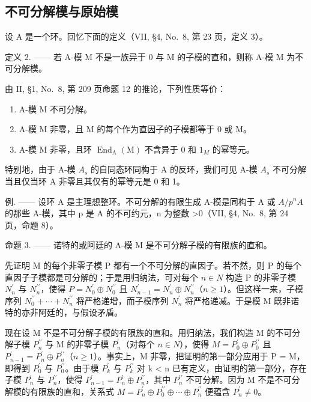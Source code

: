 \subsection{不可分解模与原始模}

设 A 是一个环。回忆下面的定义（VII, §4, No.~8, 第 23 页，定义 3）。

定义 2. —— 若 A-模 M 不是一族异于 0 与 M 的子模的直和，则称 A-模 M 为不可分解模。

由 II, §1, No.~8, 第 209 页命题 12 的推论，下列性质等价：

\begin{enumerate}
\def\labelenumi{\alph{enumi})}
\item
  A-模 M 不可分解。
\item
  A-模 M 非零，且 M 的每个作为直因子的子模都等于 0 或 M。
\item
  A-模 M 非零，且环 \(\operatorname{End}_{\mathrm{A}}(\mathrm{M})\) 不含异于 0 和 \(1_{M}\) 的幂等元。
\end{enumerate}

特别地，由于 A-模 \(A_{s}\) 的自同态环同构于 A 的反环，我们可见 A-模 \(A_{s}\) 不可分解当且仅当环 A 非零且其仅有的幂等元是 0 和 1。

例. —— 设环 A 是主理想整环。不可分解的有限生成 A-模是同构于 A 或 \(A/p^{n}A\) 的那些 A-模，其中 p 是 A 的不可约元，n 为整数 \textgreater0（VII, §4, No.~8, 第 24 页，命题 8）。

命题 3. —— 诺特的或阿廷的 A-模 M 是不可分解子模的有限族的直和。

先证明 M 的每个非零子模 P 都有一个不可分解的直因子。若不然，则 P 的每个直因子子模都是可分解的；于是用归纳法，可对每个 \(n \in N\) 构造 P 的非零子模 \(N_{n}^{\prime}\) 与 \(N_{n}^{\prime\prime}\)，使得 \(P = N_{0}^{\prime} \oplus N_{0}^{\prime\prime}\) 且 \(N_{n-1}^{\prime} = N_{n}^{\prime} \oplus N_{n}^{\prime\prime}\)（\(n \geqslant 1\)）。但这样一来，子模序列 \(N_{0}^{\prime\prime} + \cdots + N_{n}^{\prime\prime}\) 将严格递增，而子模序列 \(N_{n}^{\prime}\) 将严格递减。于是模 M 既非诺特的亦非阿廷的，与假设矛盾。

现在设 M 不是不可分解子模的有限族的直和。用归纳法，我们构造 M 的不可分解子模 \(P_{n}^{\prime\prime}\) 与 M 的非零子模 \(P_{n}^{\prime}\)（对每个 \(n \in N\)），使得 \(M = P_{0}^{\prime} \oplus P_{0}^{\prime\prime}\) 且 \(P_{n-1}^{\prime} = P_{n}^{\prime} \oplus P_{n}^{\prime\prime}\)（\(n \geqslant 1\)）。事实上，M 非零，把证明的第一部分应用于 P = M，即得到 \(P_{0}^{\prime}\) 与 \(P_{0}^{\prime\prime}\)。由于模 \(P_{k}^{\prime}\) 与 \(P_{k}^{\prime\prime}\) 对 k \textless{} n 已有定义，由证明的第一部分，存在子模 \(P_{n}^{\prime}\) 与 \(P_{n}^{\prime\prime}\)，使得 \(P_{n-1}^{\prime} = P_{n}^{\prime} \oplus P_{n}^{\prime\prime}\)，其中 \(P_{n}^{\prime\prime}\) 不可分解。因为 M 不是不可分解模的有限族的直和，关系式 \(M = P_{n}^{\prime} \oplus P_{0}^{\prime\prime} \oplus \cdots \oplus P_{n}^{\prime\prime}\) 便蕴含 \(P_{n}^{\prime} \neq 0\)。

